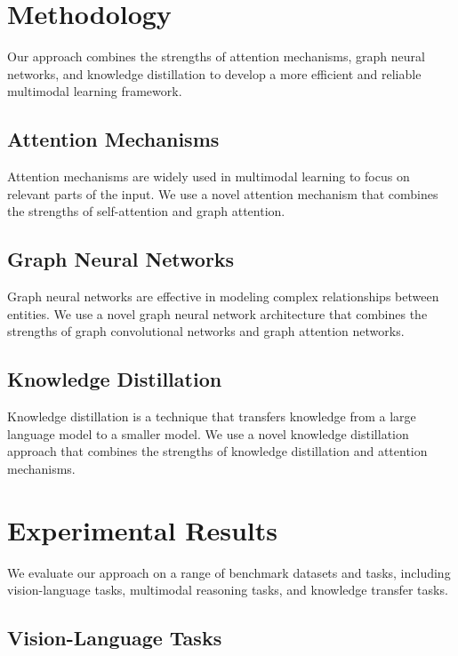 \documentclass{article}
\begin{document}
\section{Methodology}

Our approach combines the strengths of attention mechanisms, graph neural networks, and knowledge distillation to develop a more efficient and reliable multimodal learning framework.

\subsection{Attention Mechanisms}

Attention mechanisms are widely used in multimodal learning to focus on relevant parts of the input. We use a novel attention mechanism that combines the strengths of self-attention and graph attention.

\subsection{Graph Neural Networks}

Graph neural networks are effective in modeling complex relationships between entities. We use a novel graph neural network architecture that combines the strengths of graph convolutional networks and graph attention networks.

\subsection{Knowledge Distillation}

Knowledge distillation is a technique that transfers knowledge from a large language model to a smaller model. We use a novel knowledge distillation approach that combines the strengths of knowledge distillation and attention mechanisms.

\section{Experimental Results}

We evaluate our approach on a range of benchmark datasets and tasks, including vision-language tasks, multimodal reasoning tasks, and knowledge transfer tasks.

\subsection{Vision-Language Tasks}
\end{document}
